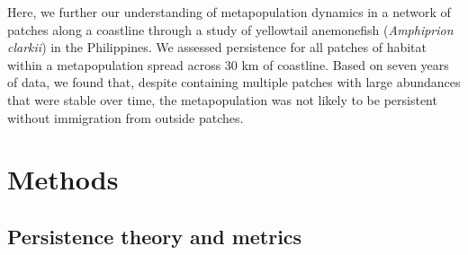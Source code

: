 \documentclass[12pt, oneside]{article}   	%
\begin{document}

Here, we further our understanding of metapopulation dynamics in a network of patches along a coastline through a study of yellowtail anemonefish (\textit{Amphiprion clarkii}) in the Philippines. We assessed persistence for all patches of habitat within a metapopulation spread across 30 km of coastline. Based on seven years of data, we found that, despite containing multiple patches with large abundances that were stable over time, the metapopulation was not likely to be persistent without immigration from outside patches.

\section*{Methods} %

\subsection*{Persistence theory and metrics}
\end{document}
